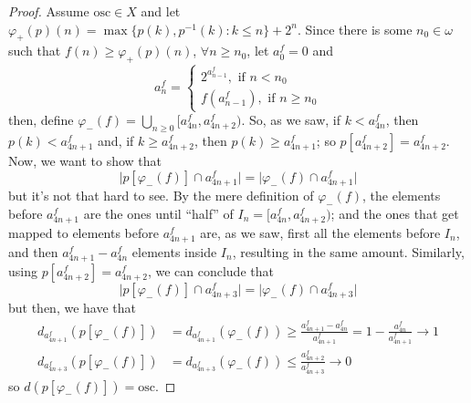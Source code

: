 \begin{proof}
    Assume $\text{osc}\in X$ and let $\varphi_+(p)(n)=\max\{p(k),p^{-1}(k):k\leq n\}+2^n$. Since there is some $n_0\in\omega$ such that $f(n)\geq\varphi_+(p)(n)$, $\forall n\geq n_0$, let $a_0^f=0$ and
    $$a_n^f=\begin{cases}
        2^{a^f_{n-1}},\text{ if }n<n_0\\
        f(a_{n-1}^f),\text{ if }n\geq n_0
    \end{cases}$$
    then, define $\varphi_-(f)=\bigcup_{n\geq0}[a_{4n}^f,a_{4n+2}^f)$. So, as we saw, if $k<a_{4n}^f$, then $p(k)<a_{4n+1}^f$ and, if $k\geq a_{4n+2}^f$, then $p(k)\geq a_{4n+1}^f$; so $p[a_{4n+2}^f]=a_{4n+2}^f$. Now, we want to show that
    $$\lvert p[\varphi_-(f)]\cap a_{4n+1}^f\rvert=\lvert\varphi_-(f)\cap a_{4n+1}^f\rvert$$
    but it's not that hard to see. By the mere definition of $\varphi_-(f)$, the elements before $a_{4n+1}^f$ are the ones until ``half'' of $I_n=[a_{4n}^f,a_{4n+2}^f)$; and the ones that get mapped to elements before $a_{4n+1}^f$ are, as we saw, first all the elements before $I_n$, and then $a_{4n+1}^f-a_{4n}^f$ elements inside $I_n$, resulting in the same amount. Similarly, using $p[a_{4n+2}^f]=a_{4n+2}^f$, we can conclude that
    $$\lvert p[\varphi_-(f)]\cap a_{4n+3}^f\rvert=\lvert\varphi_-(f)\cap a_{4n+3}^f\rvert$$
    but then, we have that
    \begin{align*}
        d_{a_{4n+1}^f}(p[\varphi_-(f)]) & = d_{a_{4n+1}^f}(\varphi_-(f))\geq\frac{a_{4n+1}^f-a_{4n}^f}{a_{4n+1}^f}=1-\frac{a_{4n}^f}{a_{4n+1}^f}\to1\\
        d_{a_{4n+3}^f}(p[\varphi_-(f)]) & = d_{a_{4n+3}^f}(\varphi_-(f))\leq\frac{a_{4n+2}^f}{a_{4n+3}^f}\to0
    \end{align*}
    so $d(p[\varphi_-(f)])=\text{osc}$.
\end{proof}


